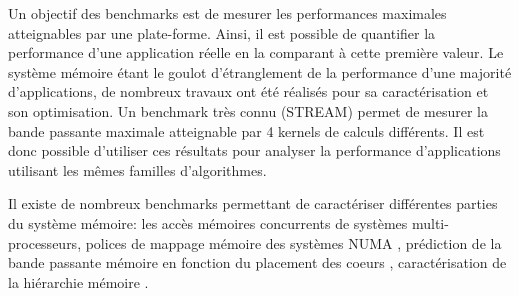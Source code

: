     Un objectif des benchmarks est de mesurer les performances maximales atteignables par une plate-forme. Ainsi, il est possible de quantifier la performance d'une application réelle en la comparant à cette première valeur. Le système mémoire étant le goulot d'étranglement de la performance d'une majorité d'applications, de nombreux travaux ont été réalisés pour sa caractérisation et son optimisation. Un benchmark très connu (STREAM) permet de mesurer la bande passante maximale atteignable par 4 kernels de calculs différents. Il est donc possible d'utiliser ces résultats pour analyser la performance d'applications utilisant les mêmes familles d'algorithmes.


   Il existe de nombreux benchmarks permettant de caractériser différentes parties du système mémoire: les accès mémoires concurrents de systèmes multi-processeurs\cite{Mandal2010}, polices de mappage mémoire des systèmes NUMA \cite{Diener2015}, prédiction de la bande passante mémoire en fonction du placement des coeurs \cite{Wang2016a}, caractérisation de la hiérarchie mémoire \cite{Cooper2011}.
    
  